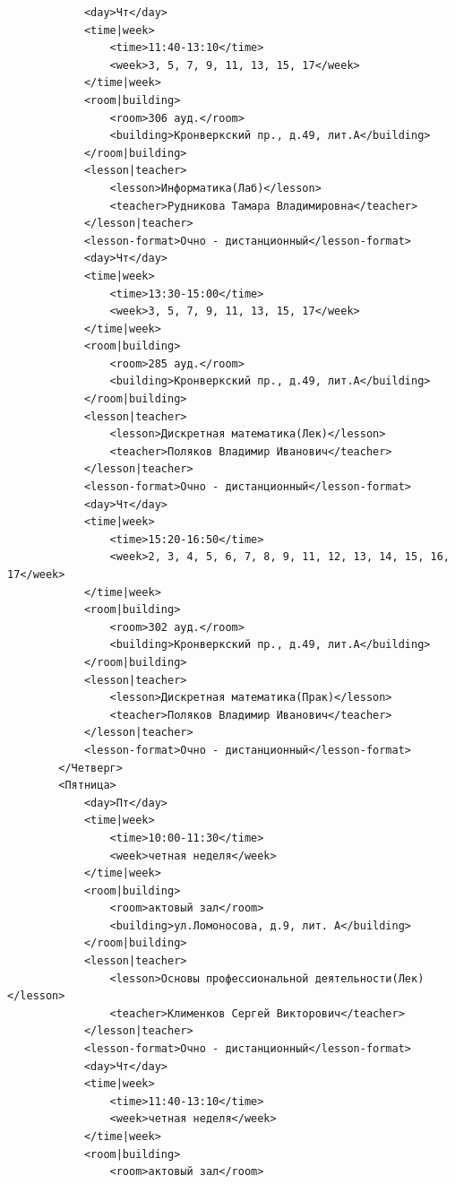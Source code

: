 \documentclass[12pt,onecolumn]{article}
\begin{document}
\begin{flushleft}
\begin{verbatim}
            <day>Чт</day>
            <time|week>
                <time>11:40-13:10</time>
                <week>3, 5, 7, 9, 11, 13, 15, 17</week>
            </time|week>
            <room|building>
                <room>306 ауд.</room>
                <building>Кронверкский пр., д.49, лит.А</building>
            </room|building>
            <lesson|teacher>
                <lesson>Информатика(Лаб)</lesson>
                <teacher>Рудникова Тамара Владимировна</teacher>
            </lesson|teacher>
            <lesson-format>Очно - дистанционный</lesson-format>
            <day>Чт</day>
            <time|week>
                <time>13:30-15:00</time>
                <week>3, 5, 7, 9, 11, 13, 15, 17</week>
            </time|week>
            <room|building>
                <room>285 ауд.</room>
                <building>Кронверкский пр., д.49, лит.А</building>
            </room|building>
            <lesson|teacher>
                <lesson>Дискретная математика(Лек)</lesson>
                <teacher>Поляков Владимир Иванович</teacher>
            </lesson|teacher>
            <lesson-format>Очно - дистанционный</lesson-format>
            <day>Чт</day>
            <time|week>
                <time>15:20-16:50</time>
                <week>2, 3, 4, 5, 6, 7, 8, 9, 11, 12, 13, 14, 15, 16, 17</week>
            </time|week>
            <room|building>
                <room>302 ауд.</room>
                <building>Кронверкский пр., д.49, лит.А</building>
            </room|building>
            <lesson|teacher>
                <lesson>Дискретная математика(Прак)</lesson>
                <teacher>Поляков Владимир Иванович</teacher>
            </lesson|teacher>
            <lesson-format>Очно - дистанционный</lesson-format>
        </Четверг>
        <Пятница>
            <day>Пт</day>
            <time|week>
                <time>10:00-11:30</time>
                <week>четная неделя</week>
            </time|week>
            <room|building>
                <room>актовый зал</room>
                <building>ул.Ломоносова, д.9, лит. А</building>
            </room|building>
            <lesson|teacher>
                <lesson>Основы профессиональной деятельности(Лек)</lesson>
                <teacher>Клименков Сергей Викторович</teacher>
            </lesson|teacher>
            <lesson-format>Очно - дистанционный</lesson-format>
            <day>Чт</day>
            <time|week>
                <time>11:40-13:10</time>
                <week>четная неделя</week>
            </time|week>
            <room|building>
                <room>актовый зал</room>

\end{verbatim}
\end{flushleft}
\end{document}
